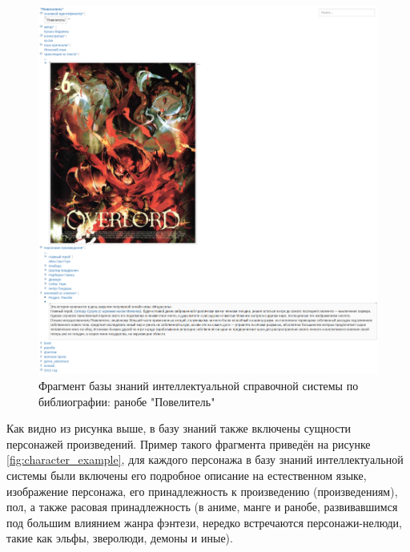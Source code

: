 \begin{figure}[H]
    \centering
    \includegraphics[scale=0.41]{imgs/overlord.png}
    \caption{Фрагмент базы знаний интеллектуальной справочной системы по библиографии: ранобе "Повелитель"}
    \label{fig:overlord}
\end{figure}

Как видно из рисунка выше, в базу знаний также включены сущности персонажей произведений. Пример такого фрагмента приведён на рисунке \ref{fig:character_example}, для каждого персонажа в базу знаний интеллектуальной системы были включены его подробное описание на естественном языке, изображение персонажа, его принадлежность к произведению (произведениям), пол, а также расовая принадлежность (в аниме, манге и ранобе, развивавшимся под большим влиянием жанра фэнтези, нередко встречаются персонажи-нелюди, такие как эльфы, зверолюди, демоны и иные).

